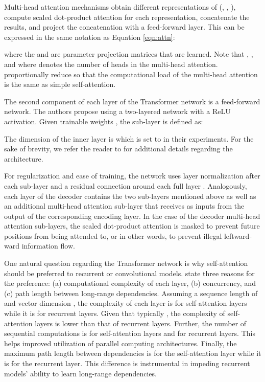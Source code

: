 \documentclass{article} \usepackage{iclr2018_conference,times}
\begin{document}
Multi-head attention mechanisms obtain  different representations of (, , ), compute scaled dot-product attention for each representation, concatenate the results, and project the concatenation with a feed-forward layer. This can be expressed in the same notation as Equation \eqref{eqn:attn}:
 
where the  and  are parameter projection matrices that are learned. Note that ,  ,  and  where  denotes the number of heads in the multi-head attention. \citet{vaswani2017attention}  proportionally reduce  so that the computational load of the multi-head attention is the same as simple self-attention.

The second component of each layer of the Transformer network is a feed-forward network. The authors propose using a two-layered network with a ReLU activation. Given trainable weights , the sub-layer is defined as:

The dimension of the inner layer is  which is set to  in their experiments. For the sake of brevity, we refer the reader to \cite{vaswani2017attention} for additional details regarding the architecture.

For regularization and ease of training, the network uses layer normalization \citep{ba2016layer} after each sub-layer and a residual connection around each full layer \citep{he2016deep}. Analogously, each layer of the decoder contains the two sub-layers mentioned above as well as an additional multi-head attention sub-layer that receives as inputs  from the output of the corresponding encoding layer. 
In the case of the decoder multi-head attention sub-layers, the scaled dot-product attention is masked to prevent future positions from being attended to, or in other words, to prevent illegal leftward-ward information flow.

One natural question regarding the Transformer network is why self-attention should be preferred to recurrent or convolutional models. \citet{vaswani2017attention} state three reasons for the preference: (a) computational complexity of each layer, (b) concurrency, and (c) {path length} between long-range dependencies. Assuming a sequence length of  and vector dimension , the complexity of each layer is  for self-attention layers while it is  for recurrent layers. Given that typically , the complexity of self-attention layers is lower than that of recurrent layers. Further, the number of sequential computations is  for self-attention layers and  for recurrent layers. This helps improved utilization of parallel computing architectures. Finally, the maximum path length between dependencies is  for the self-attention layer while it is  for the recurrent layer. This difference is instrumental in impeding recurrent models' ability to learn long-range dependencies. 
\end{document}
